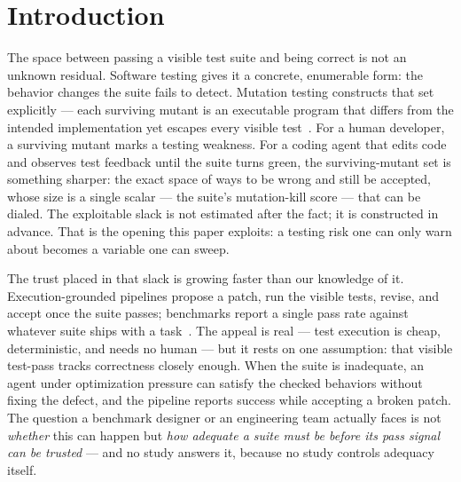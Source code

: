 \documentclass[conference]{IEEEtran}
\begin{document}
\section{Introduction}\label{sec:intro}

The space between passing a visible test suite and being correct is not an
unknown residual. Software testing gives it a concrete, enumerable form:
the behavior changes the suite fails to detect. Mutation testing constructs
that set explicitly --- each surviving mutant is an executable program that
differs from the intended implementation yet escapes every visible
test~\cite{Papadakis2019Survey}. For a human developer, a surviving mutant
marks a testing weakness. For a coding agent that edits code and observes
test feedback until the suite turns green, the surviving-mutant set is
something sharper: the exact space of ways to be wrong and still be
accepted, whose size is a single scalar --- the suite's mutation-kill
score --- that can be dialed. The exploitable slack is not estimated after
the fact; it is constructed in advance. That is the opening this paper
exploits: a testing risk one can only warn about becomes a variable one can
sweep.

The trust placed in that slack is growing faster than our knowledge of it.
Execution-grounded pipelines propose a patch, run the visible tests,
revise, and accept once the suite passes; benchmarks report a single pass
rate against whatever suite ships with a
task~\cite{SWEbench_VTF8yNQM66}. The appeal is real --- test execution is
cheap, deterministic, and needs no human --- but it rests on one
assumption: that visible test-pass tracks correctness closely enough. When
the suite is inadequate, an agent under optimization pressure can satisfy
the checked behaviors without fixing the defect, and the pipeline reports
success while accepting a broken patch. The question a benchmark designer
or an engineering team actually faces is not \emph{whether} this can
happen but \emph{how adequate a suite must be before its pass signal can
be trusted} --- and no study answers it, because no study controls
adequacy itself.
\end{document}
